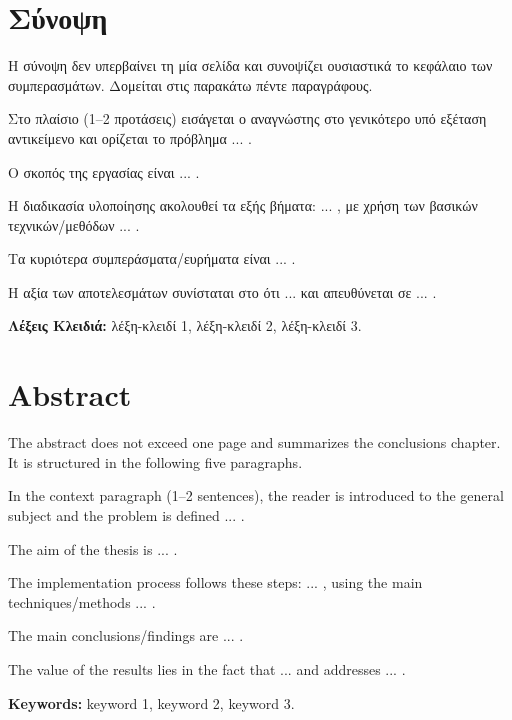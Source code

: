 \section*{Σύνοψη}

Η σύνοψη δεν υπερβαίνει τη μία σελίδα και συνοψίζει ουσιαστικά το κεφάλαιο
των συμπερασμάτων. Δομείται στις παρακάτω πέντε παραγράφους.

Στο πλαίσιο (1--2 προτάσεις) εισάγεται ο αναγνώστης στο γενικότερο υπό
εξέταση αντικείμενο και ορίζεται το πρόβλημα ... .

Ο σκοπός της εργασίας είναι ... .

Η διαδικασία υλοποίησης ακολουθεί τα εξής βήματα: ... , με χρήση των
βασικών τεχνικών/μεθόδων ... .

Τα κυριότερα συμπεράσματα/ευρήματα είναι ... .

Η αξία των αποτελεσμάτων συνίσταται στο ότι ... και απευθύνεται σε ... .

\textbf{Λέξεις Κλειδιά:} λέξη-κλειδί 1, λέξη-κλειδί 2, λέξη-κλειδί 3.

\newpage
\section*{Abstract}
\begin{english}

	The abstract does not exceed one page and summarizes the conclusions
	chapter. It is structured in the following five paragraphs.

	In the context paragraph (1--2 sentences), the reader is introduced to the
	general subject and the problem is defined ... .

	The aim of the thesis is ... .

	The implementation process follows these steps: ... , using the main
	techniques/methods ... .

	The main conclusions/findings are ... .

	The value of the results lies in the fact that ... and addresses ... .

	\vspace{1em}
	\textbf{Keywords:} keyword 1, keyword 2, keyword 3.

\end{english}
